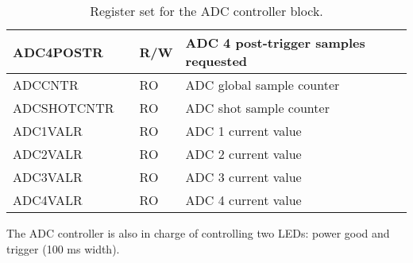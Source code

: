 \documentclass{article}
\begin{document}
\begin{table}[htbp]
\begin{tabularx}{\textwidth}{|l|r|l|X|}
    \hline
    ADC4POSTR & & R/W & ADC 4 post-trigger samples requested \\
    \hline
    ADCCNTR & & RO & ADC global sample counter \\
    \hline
    ADCSHOTCNTR & & RO & ADC shot sample counter \\
    \hline
    ADC1VALR & & RO & ADC 1 current value \\
    \hline
    ADC2VALR & & RO & ADC 2 current value \\
    \hline
    ADC3VALR & & RO & ADC 3 current value \\
    \hline
    ADC4VALR & & RO & ADC 4 current value \\
    \hline
  \end{tabularx}
  \caption{Register set for the ADC controller block.}
  \label{tab:adc_control}
\end{table}

The ADC controller is also in charge of controlling two LEDs: power good and trigger (100 ms width).
\end{document}
